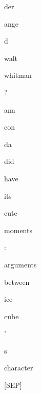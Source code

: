 \documentclass[varwidth=150mm]{standalone}
\begin{document}
\begin{CJK*}{UTF8}{gbsn}
{{{\colorbox{red!1.0936211347579956}{\strut der}\colorbox{red!0.0}{\strut ange}\colorbox{red!0.0}{\strut d} \colorbox{red!5.053958415985107}{\strut walt} \colorbox{red!9.401449203491211}{\strut whitman} \colorbox{red!6.234510898590088}{\strut ?} \colorbox{red!11.418460845947266}{\strut ana}\colorbox{red!4.090542316436768}{\strut con}\colorbox{red!7.6741743087768555}{\strut da} \colorbox{red!19.436546325683594}{\strut did} \colorbox{red!6.170274257659912}{\strut have} \colorbox{red!14.987518310546875}{\strut its} \colorbox{red!13.813376426696777}{\strut cute} \colorbox{red!36.05052185058594}{\strut moments} \colorbox{red!28.193622589111328}{\strut :} \colorbox{red!6.982478141784668}{\strut arguments} \colorbox{red!1.6906825304031372}{\strut between} \colorbox{red!12.947731018066406}{\strut ice} \colorbox{red!19.92660140991211}{\strut cube} \colorbox{red!1.738193392753601}{\strut '} \colorbox{red!1.1782313585281372}{\strut s} \colorbox{red!6.408397197723389}{\strut character} \colorbox{red!1.5150562524795532}{\strut [SEP]}
}}}
\end{CJK*}
\end{document}
